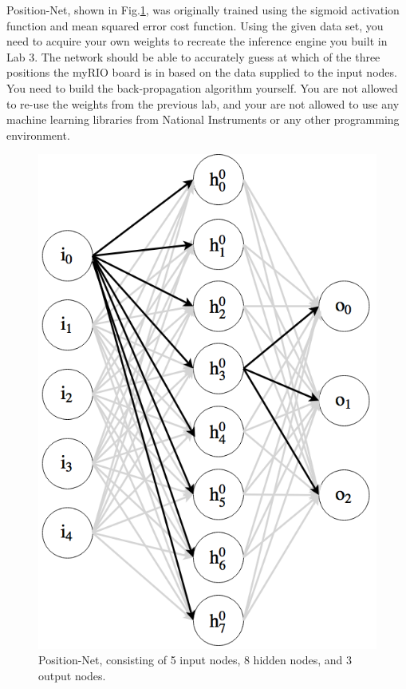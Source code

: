 \documentclass{article}
\begin{document}
Position-Net, shown in Fig.\ref{fig:position_net}, was originally trained using the sigmoid activation function and mean squared error cost function. Using the given data set, you need to acquire your own weights to recreate the inference engine you built in Lab 3. The network should be able to accurately guess at which of the three positions the myRIO board is in based on the data supplied to the input nodes. You need to build the back-propagation algorithm yourself. You are not allowed to re-use the weights from the previous lab, and your are not allowed to use any machine learning libraries from National Instruments or any other programming environment.  

\begin{figure}[h]
\centering
\includegraphics[scale=0.3]{figs/position_net.png}
\caption{Position-Net, consisting of 5 input nodes, 8 hidden nodes, and 3 output nodes.}
\label{fig:position_net}
\end{figure}
\end{document}
